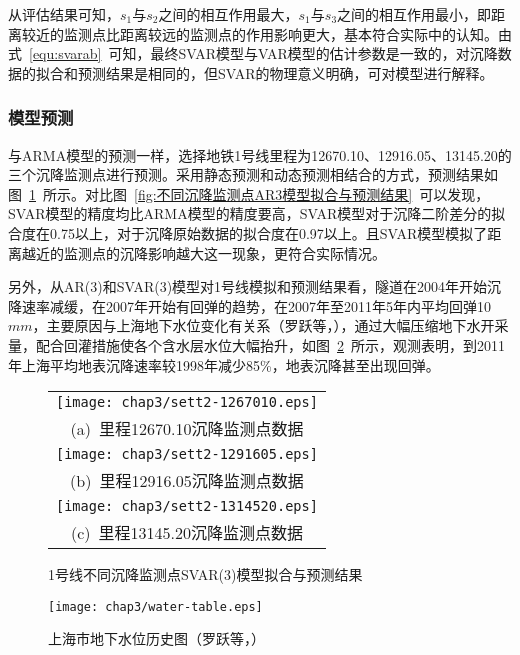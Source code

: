 从评估结果可知，$s_1$与$s_2$之间的相互作用最大，$s_1$与$s_3$之间的相互作用最小，即距离较近的监测点比距离较远的监测点的作用影响更大，基本符合实际中的认知。由式~\ref{equ:svarab}~可知，最终SVAR模型与VAR模型的估计参数是一致的，对沉降数据的拟合和预测结果是相同的，但SVAR的物理意义明确，可对模型进行解释。

\subsubsection{模型预测}

与ARMA模型的预测一样，选择地铁1号线里程为12670.10、12916.05、13145.20的三个沉降监测点进行预测。采用静态预测和动态预测相结合的方式，预测结果如图~\ref{fig:不同沉降监测点SVAR3模型拟合与预测结果}~所示。对比图~\ref{fig:不同沉降监测点AR3模型拟合与预测结果}~可以发现，SVAR模型的精度均比ARMA模型的精度要高，SVAR模型对于沉降二阶差分的拟合度在0.75以上，对于沉降原始数据的拟合度在0.97以上。且SVAR模型模拟了距离越近的监测点的沉降影响越大这一现象，更符合实际情况。

另外，从AR(3)和SVAR(3)模型对1号线模拟和预测结果看，隧道在2004年开始沉降速率减缓，在2007年开始有回弹的趋势，在2007年至2011年5年内平均回弹10$mm$，主要原因与上海地下水位变化有关系（罗跃等，\citeyear{罗跃2015上海市地下水位大幅抬升条件下土层变形特征分析}），通过大幅压缩地下水开采量，配合回灌措施使各个含水层水位大幅抬升，如图~\ref{fig:上海市地下水位历史图}~所示，观测表明，到2011年上海平均地表沉降速率较1998年减少85\%，地表沉降甚至出现回弹。

\begin{figure}[htbp] 
    \centering 
    \begin{tabular}{c} 
        \texttt{[image: chap3/sett2-1267010.eps]} \\ 
        (a)~里程12670.10沉降监测点数据 \\
        \texttt{[image: chap3/sett2-1291605.eps]} \\ 
        (b)~里程12916.05沉降监测点数据 \\
        \texttt{[image: chap3/sett2-1314520.eps]} \\ 
        (c)~里程13145.20沉降监测点数据 \\
    \end{tabular}
    \caption{1号线不同沉降监测点SVAR(3)模型拟合与预测结果} 
    \label{fig:不同沉降监测点SVAR3模型拟合与预测结果} 
\end{figure}

\begin{figure}[htb!]
    \centering
    \texttt{[image: chap3/water-table.eps]}
    \caption{上海市地下水位历史图（罗跃等，\citeyear{罗跃2015上海市地下水位大幅抬升条件下土层变形特征分析}）}
    \label{fig:上海市地下水位历史图}
\end{figure}

